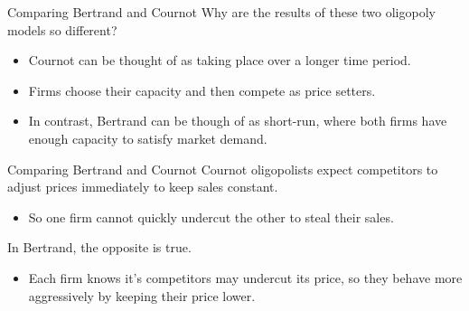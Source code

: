 \documentclass{beamer}
\begin{document}
\begin{frame}{Comparing Bertrand and Cournot}
  Why are the results of these two oligopoly models so different?

  \begin{itemize}
    \item Cournot can be thought of as taking place over a longer time period.
    \item Firms choose their capacity and then compete as price setters.
    \item In contrast, Bertrand can be though of as short-run, where both firms have enough capacity to satisfy market demand.
  \end{itemize}
\end{frame}


\begin{frame}{Comparing Bertrand and Cournot}
  Cournot oligopolists expect competitors to adjust prices immediately to keep sales constant.

  \begin{itemize}
    \item So one firm cannot quickly undercut the other to steal their sales.
  \end{itemize}
  
  \bigskip
  In Bertrand, the opposite is true.

  \begin{itemize}
    \item Each firm knows it's competitors may undercut its price, so they behave more aggressively by keeping their price lower.
  \end{itemize}
\end{frame}
\end{document}
